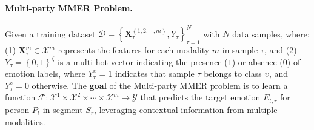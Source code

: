 


\paragraph{Multi-party MMER Problem.}
Given a training dataset $\mathcal{D} = \left\{ \bm{X}_{\tau}^{\left\{ 1, 2, \cdots, m \right\}}, Y_{\tau} \right\}_{\tau=1}^{N}$ with $N$ data samples, where:
(1) $\bm{X}_{\tau}^{m} \in \bm{\mathcal{X}}^{m}$ represents the features for each modality $m$ in sample $\tau$, and
(2) $Y_{\tau} = \left\{ 0, 1 \right\}^{\zeta}$ is a multi-hot vector indicating the presence ($1$) or absence ($0$) of emotion labels, where $Y_{\tau}^{\upsilon} = 1$ indicates that sample $\tau$ belongs to class $\upsilon$, and $Y_{\tau}^{\upsilon} = 0$ otherwise.
% 
% 
The \textbf{goal} of the Multi-party MMER problem is to learn a function $\mathcal{F}: \bm{\mathcal{X}}^{1} \times \bm{\mathcal{X}}^{2} \times \cdots \times \bm{\mathcal{X}}^{m} \mapsto \mathcal{Y}$ that predicts the target emotion $E_{t,r}$ for person $P_{t}$ in segment $S_{r}$, leveraging contextual information from multiple modalities.




